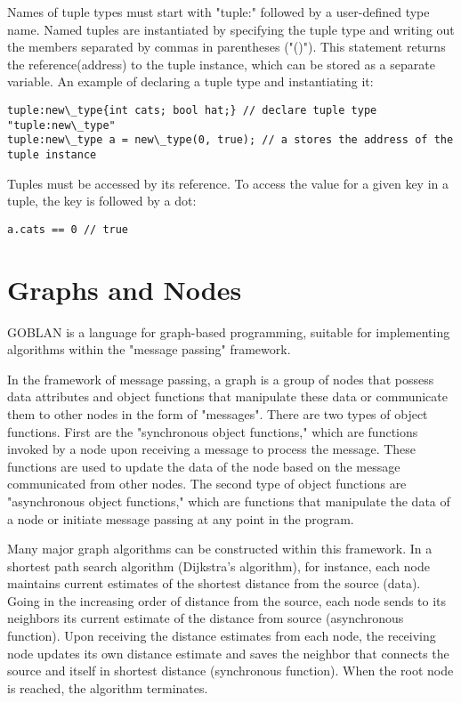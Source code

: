 \documentclass{article}
\begin{document}
Names of tuple types must start with "tuple:" followed by a user-defined type name. Named tuples are instantiated by specifying the tuple type and writing out the members separated by commas in parentheses ("()"). This statement returns the reference(address) to the tuple instance, which can be stored as a separate variable. An example of declaring a tuple type and instantiating it:

\begin{lstlisting}
tuple:new\_type{int cats; bool hat;} // declare tuple type "tuple:new\_type"
tuple:new\_type a = new\_type(0, true); // a stores the address of the tuple instance
\end{lstlisting}

Tuples must be accessed by its reference. To access the value for a given key in a tuple, the key is followed by a dot:
\begin{lstlisting}
a.cats == 0 // true
\end{lstlisting}

\section{Graphs and Nodes}

GOBLAN is a language for graph-based programming, suitable for implementing algorithms within the "message passing" framework.

In the framework of message passing, a graph is a group of nodes that possess data attributes and object functions that manipulate these data or communicate them to other nodes in the form of "messages". There are two types of object functions. First are the "synchronous object functions," which are functions invoked by a node upon receiving a message to process the message. These functions are used to update the data of the node based on the message communicated from other nodes. The second type of object functions are "asynchronous object functions," which are functions that manipulate the data of a node or initiate message passing at any point in the program. 

Many major graph algorithms can be constructed within this framework. In a shortest path search algorithm (Dijkstra’s algorithm), for instance, each node maintains current estimates of the shortest distance from the source (data). Going in the increasing order of distance from the source, each node sends to its neighbors its current estimate of the distance from source (asynchronous function). Upon receiving the distance estimates from each node, the receiving node updates its own distance estimate and saves the neighbor that connects the source and itself in shortest distance (synchronous function). When the root node is reached, the algorithm terminates.
\end{document}
